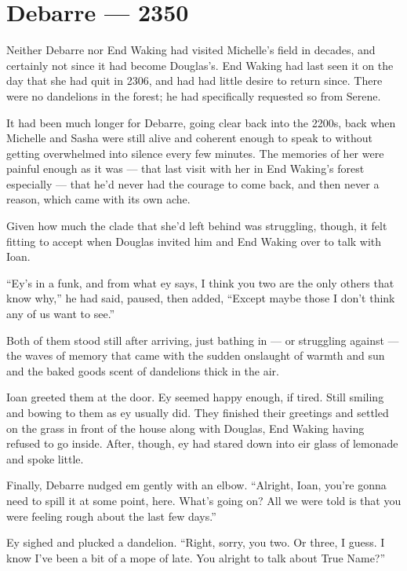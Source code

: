 \hypertarget{debarre-2350}{%
\chapter{Debarre — 2350}\label{debarre-2350}}

Neither Debarre nor End Waking had visited Michelle's field in decades, and certainly not since it had become Douglas's. End Waking had last seen it on the day that she had quit in 2306, and had had little desire to return since. There were no dandelions in the forest; he had specifically requested so from Serene.

It had been much longer for Debarre, going clear back into the 2200s, back when Michelle and Sasha were still alive and coherent enough to speak to without getting overwhelmed into silence every few minutes. The memories of her were painful enough as it was — that last visit with her in End Waking's forest especially — that he'd never had the courage to come back, and then never a reason, which came with its own ache.

Given how much the clade that she'd left behind was struggling, though, it felt fitting to accept when Douglas invited him and End Waking over to talk with Ioan.

``Ey's in a funk, and from what ey says, I think you two are the only others that know why,'' he had said, paused, then added, ``Except maybe those I don't think any of us want to see.''

Both of them stood still after arriving, just bathing in — or struggling against — the waves of memory that came with the sudden onslaught of warmth and sun and the baked goods scent of dandelions thick in the air.

Ioan greeted them at the door. Ey seemed happy enough, if tired. Still smiling and bowing to them as ey usually did. They finished their greetings and settled on the grass in front of the house along with Douglas, End Waking having refused to go inside. After, though, ey had stared down into eir glass of lemonade and spoke little.

Finally, Debarre nudged em gently with an elbow. ``Alright, Ioan, you're gonna need to spill it at some point, here. What's going on? All we were told is that you were feeling rough about the last few days.''

Ey sighed and plucked a dandelion. ``Right, sorry, you two. Or three, I guess. I know I've been a bit of a mope of late. You alright to talk about True Name?''

